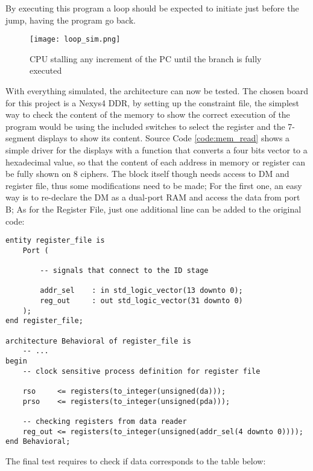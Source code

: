 By executing this program a loop should be expected to initiate just before the jump, having the program go back. 

\begin{figure}[!ht]
    \centering
    \texttt{[image: loop\_sim.png]}
    \caption{CPU stalling any increment of the PC until the branch is fully executed}
    \label{fig:loop_sim}
\end{figure}

With everything simulated, the architecture can now be tested. The chosen board for this project is a Nexys4 DDR, by setting up the constraint file, the simplest way to check the content of the memory to show the correct execution of the program would be using the included switches to select the register and the 7-segment displays to show its content.
Source Code \ref{code:mem_read} shows a simple driver for the displays with a function that converts a four bits vector to a hexadecimal value, so that the content of each address in memory or register can be fully shown on 8 ciphers.
The block itself though needs access to DM and register file, thus some modifications need to be made; For the first one, an easy way is to re-declare the DM as a dual-port RAM and access the data from port B; As for the Register File, just one additional line can be added to the original code:


\begin{verbatim}
entity register_file is
    Port ( 
        
        -- signals that connect to the ID stage
        
        addr_sel    : in std_logic_vector(13 downto 0);
        reg_out     : out std_logic_vector(31 downto 0)
    );
end register_file;

architecture Behavioral of register_file is
    -- ...
begin
    -- clock sensitive process definition for register file
    
    rso     <= registers(to_integer(unsigned(da)));
    prso    <= registers(to_integer(unsigned(pda)));
    
    -- checking registers from data reader
    reg_out <= registers(to_integer(unsigned(addr_sel(4 downto 0))));
end Behavioral;
\end{verbatim}

The final test requires to check if data corresponds to the table below:

